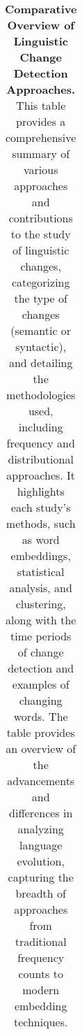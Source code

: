 \begin{table}[]
\begin{tabular}{@{}llllll@{}}
\bottomrule
\end{tabular}
\caption{\textbf{Comparative Overview of Linguistic Change Detection Approaches.}
This table provides a comprehensive summary of various approaches and contributions to the study of linguistic changes,
    categorizing the type of changes (semantic or syntactic), and detailing the methodologies used, including frequency and distributional approaches.
    It highlights each study’s methods, such as word embeddings, statistical analysis, and clustering, along with the time periods of change detection and examples of changing words.
    The table provides an overview of the advancements and differences in analyzing language evolution,
    capturing the breadth of approaches from traditional frequency counts to modern embedding techniques.}
\label{tab:related-work}
\end{table}

